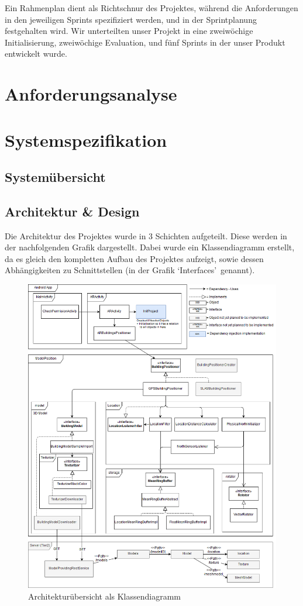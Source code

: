 \documentclass[a4paper]{scrreprt}
\begin{document}
Ein Rahmenplan dient als Richtschnur des Projektes, während die Anforderungen in den jeweiligen Sprints spezifiziert werden, und in der Sprintplanung festgehalten wird. Wir unterteilten unser Projekt in eine zweiwöchige Initialisierung, zweiwöchige Evaluation, und fünf Sprints in der unser Produkt entwickelt wurde.

\section{Anforderungsanalyse}


\section{Systemspezifikation}

\subsection{Systemübersicht}

\subsection{Architektur \& Design}
Die Architektur des Projektes wurde in 3 Schichten aufgeteilt. Diese werden in der nachfolgenden Grafik dargestellt. Dabei wurde ein Klassendiagramm erstellt, da es gleich den kompletten Aufbau des Projektes aufzeigt, sowie dessen Abhängigkeiten zu Schnittstellen (in der Grafik \textquoteleft Interfaces\textquoteright\ genannt).

\begin{figure}[h!]
	\includegraphics[keepaspectratio, width=\textwidth]{ArchitekturOverview.png}
	\caption{Architekturübersicht als Klassendiagramm}
\end{figure}
\end{document}
